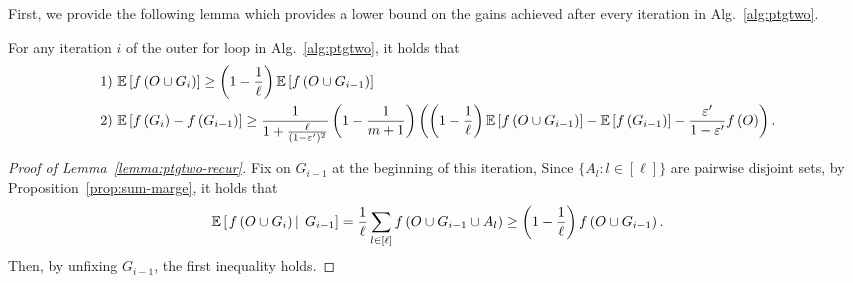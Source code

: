 First, we provide the following lemma which provides a lower bound
on the gains achieved after every iteration in Alg.~\ref{alg:ptgtwo}.
\begin{lemma}\label{lemma:ptgtwo-recur}
For any iteration $i$ of the outer for loop in Alg.~\ref{alg:ptgtwo},
it holds that
\begin{align*}
\text{1) } & \mathbb{E}\left[ f \left( O\cup G_i \right) \right]\ge \left(1-\frac{1}{\ell}\right) \mathbb{E}\left[ f \left( O\cup G_{i-1} \right) \right]\\
\text{2) } & \mathbb{E}\left[ f \left( G_i \right) - f \left( G_{i-1} \right) \right]
\ge\frac{1}{1+\frac{\ell}{(1-\varepsilon')^2}}\left(1-\frac{1}{m+1}\right)\left(\left(1-\frac{1}{\ell}\right)  \mathbb{E}\left[ f \left( O\cup G_{i-1} \right) \right] - \mathbb{E}\left[ f \left( G_{i-1} \right) \right] - \frac{\varepsilon'}{1-\varepsilon'}f \left( O \right)\right).
\end{align*}
\end{lemma}
\begin{proof}[Proof of Lemma~\ref{lemma:ptgtwo-recur}]
Fix on $G_{i-1}$ at the beginning of this iteration,
Since $\{A_l: l\in [\ell]\}$ are pairwise disjoint sets,
by Proposition~\ref{prop:sum-marge}, it holds that
\[\mathbb{E}\left[\left. f \left( O\cup G_i \right) \, \right| \; G_{i-1} \right] = \frac{1}{\ell}\sum_{l\in [\ell]}f \left( O\cup G_{i-1}\cup A_l \right) \ge \left(1-\frac{1}{\ell}\right)f \left( O\cup G_{i-1} \right).\]
Then, by unfixing $G_{i-1}$, the first inequality holds.


\end{proof}

